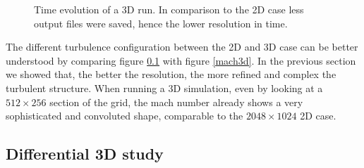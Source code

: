 {\begin{figure}[t!]
	\caption{Time evolution of a 3D run. In comparison to the 2D case less output files were saved, hence the lower resolution in time.}
	\label{3dsingle}
\end{figure}
The different turbulence configuration between the 2D and 3D case can be better understood by comparing figure \ref{} with figure \ref{mach3d}. In the previous section we showed that, the better the resolution, the more refined and complex the turbulent structure. When running a 3D simulation, even by looking at a $512 \times 256$ section of the grid, the mach number already shows a very sophisticated and convoluted shape, comparable to the $2048 \times 1024$ 2D case.
}
\subsection{Differential 3D study}
